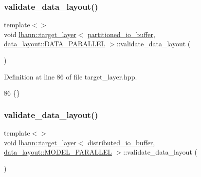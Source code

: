 \subsubsection{\texorpdfstring{validate\+\_\+data\+\_\+layout()}{validate\_data\_layout()}\hspace{0.1cm}{\footnotesize\ttfamily [3/5]}}
{\footnotesize\ttfamily template$<$$>$ \\
void \hyperlink{classlbann_1_1target__layer}{lbann\+::target\+\_\+layer}$<$ \hyperlink{classlbann_1_1partitioned__io__buffer}{partitioned\+\_\+io\+\_\+buffer}, \hyperlink{base_8hpp_a786677cbfb3f5677b4d84f3056eb08dba37d2a3465f7cbf4ab60f4e79944d0638}{data\+\_\+layout\+::\+D\+A\+T\+A\+\_\+\+P\+A\+R\+A\+L\+L\+EL} $>$\+::validate\+\_\+data\+\_\+layout (\begin{DoxyParamCaption}{ }\end{DoxyParamCaption})\hspace{0.3cm}{\ttfamily [inline]}}



Definition at line 86 of file target\+\_\+layer.\+hpp.


\begin{DoxyCode}
86 \{\}
\end{DoxyCode}
\mbox{\label{classlbann_1_1target__layer_a24db2fc4df186477d6d95e7353da4d8c}} 
\subsubsection{\texorpdfstring{validate\+\_\+data\+\_\+layout()}{validate\_data\_layout()}\hspace{0.1cm}{\footnotesize\ttfamily [4/5]}}
{\footnotesize\ttfamily template$<$$>$ \\
void \hyperlink{classlbann_1_1target__layer}{lbann\+::target\+\_\+layer}$<$ \hyperlink{classlbann_1_1distributed__io__buffer}{distributed\+\_\+io\+\_\+buffer}, \hyperlink{base_8hpp_a786677cbfb3f5677b4d84f3056eb08dbac94d7b0e44ab8bdcdad694a673cdeae0}{data\+\_\+layout\+::\+M\+O\+D\+E\+L\+\_\+\+P\+A\+R\+A\+L\+L\+EL} $>$\+::validate\+\_\+data\+\_\+layout (\begin{DoxyParamCaption}{ }\end{DoxyParamCaption})\hspace{0.3cm}{\ttfamily [inline]}}



